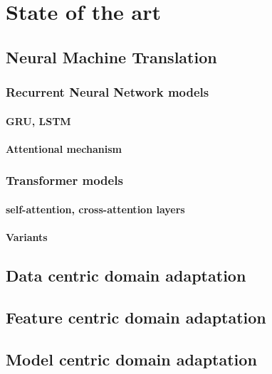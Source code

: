 \part{State of the art}
\chapter{Neural Machine Translation}
\section{Recurrent Neural Network models}
\subsection{GRU, LSTM}
\subsection{Attentional mechanism}
\section{Transformer models}
\subsection{self-attention, cross-attention layers}
\subsection{Variants}
\chapter{Data centric domain adaptation}
\chapter{Feature centric domain adaptation}
\chapter{Model centric domain adaptation}